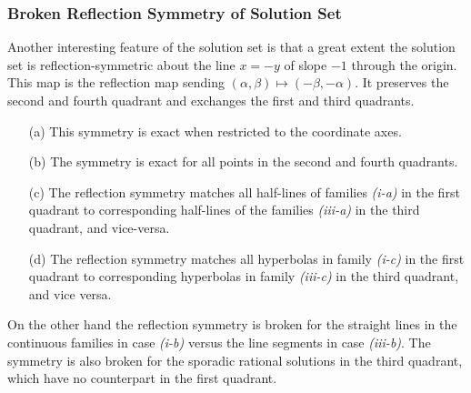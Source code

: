 \documentclass[12pt,letterpaper, reqno]{amsart}
\theoremstyle{definition}
\theoremstyle{remark}
\begin{document}

\subsubsection{Broken Reflection  Symmetry of Solution Set}\label{sec:133}
Another interesting feature of the solution set  
is that  a great extent the  solution set is  reflection-symmetric about the
line $x=-y$ of slope $-1$ through the origin. This map  is the reflection map sending $(\alpha, \beta) \mapsto (-\beta, -\alpha)$.
It preserves the second and fourth quadrant and exchanges the first and third quadrants.
\begin{enumerate}
\item[(a)]
This symmetry is exact  when restricted to the coordinate axes.
\item[(b)]
The symmetry is exact for  all points in the  second and fourth quadrants. 
\item[(c)]
The  reflection symmetry
matches all half-lines of  families {\it (i-a)}  in the first quadrant to corresponding
half-lines of the families {\it (iii-a)}  in the third quadrant, and vice-versa.
\item[(d)]
The reflection symmetry matches all hyperbolas in family {\it (i-c)} in the first quadrant to corresponding hyperbolas in family {\it (iii-c)}
in the third quadrant, and vice versa. 
\end{enumerate}

On the other hand the reflection symmetry is  broken  for the straight lines in the continuous families in case  {\it (i-b)} versus
the line segments in case {\it (iii-b)}. 
The symmetry is also  broken for the sporadic rational solutions in the third quadrant, which have no counterpart in the first quadrant. %
\end{document}
